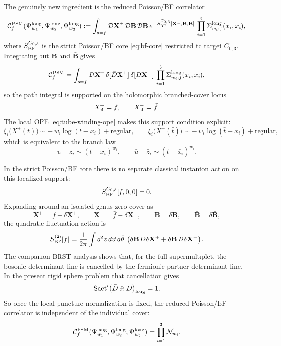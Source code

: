 \documentclass[11pt]{article}
\newcommand{\mc}[1]{\mathcal{#1}}
\begin{document}
The genuinely new ingredient is the reduced Poisson/BF correlator
\begin{equation}\label{eq:fixed-cover-psm-path-integral}
\mc C_f^{\rm PSM}(\Psi_{w_1}^{\rm long},\Psi_{w_2}^{\rm long},\Psi_{w_3}^{\rm long})
:=
\int_{\mathfrak s=f}
\mc D\mathbf X^\pm\,\mc D\mathbf B\,\mc D\bar{\mathbf B}\,
e^{-S_{\rm BF}^{C_{0,3}}[\mathbf X^\pm,\mathbf B,\bar{\mathbf B}]}\,
\prod_{i=1}^3 \Sigma^{\rm long}_{w_i;f}(x_i,\bar x_i),
\end{equation}
where $S_{\rm BF}^{C_{0,3}}$ is the strict Poisson/BF core \eqref{eq:bf-core} restricted to target $C_{0,3}$. Integrating out $\mathbf B$ and $\bar{\mathbf B}$ gives
\begin{equation}\label{eq:fixed-cover-psm-localization}
\mc C_f^{\rm PSM}
=
\int_{\mathfrak s=f}
\mc D\mathbf X^\pm\,
\delta[\bar D\mathbf X^+]\,\delta[D\mathbf X^-]\,
\prod_{i=1}^3 \Sigma^{\rm long}_{w_i;f}(x_i,\bar x_i),
\end{equation}
so the path integral is supported on the holomorphic branched-cover locus
\[
X^+_{\rm cl}=f,\qquad X^-_{\rm cl}=\bar f.
\]
The local OPE \eqref{eq:tube-winding-ope} makes this support condition explicit:
\begin{equation}\label{eq:psm-vertex-local-monodromy}
\xi_i\!\big(X^+(t)\big)
\sim
-\,w_i\log(t-x_i)+\text{regular},
\qquad
\bar\xi_i\!\big(X^-(\bar t)\big)
\sim
-\,w_i\log(\bar t-\bar x_i)+\text{regular},
\end{equation}
which is equivalent to the branch law
\[
u-z_i\sim (t-x_i)^{w_i},
\qquad
\bar u-\bar z_i\sim (\bar t-\bar x_i)^{w_i}.
\]

In the strict Poisson/BF core there is no separate classical instanton action on this localized support:
\begin{equation}\label{eq:psm-classical-action-zero}
S_{\rm BF}^{C_{0,3}}[f,0,0]=0.
\end{equation}
Expanding around an isolated genus-zero cover as
\[
\mathbf X^+=f+\delta \mathbf X^+,\qquad
\mathbf X^-=\bar f+\delta \mathbf X^-,
\qquad
\mathbf B=\delta \mathbf B,\qquad
\bar{\mathbf B}=\delta \bar{\mathbf B},
\]
the quadratic fluctuation action is
\begin{equation}\label{eq:psm-quadratic-fluctuation}
S_{\rm BF}^{(2)}[f]
=
\frac{1}{2\pi}\int d^2z\,d\vartheta\,d\bar\vartheta\,
\left(
\delta \mathbf B\,\bar D \delta \mathbf X^+
+
\delta \bar{\mathbf B}\,D \delta \mathbf X^-
\right).
\end{equation}
The companion BRST analysis shows that, for the full supermultiplet, the bosonic determinant line is cancelled by the fermionic partner determinant line. In the present rigid sphere problem that cancellation gives
\begin{equation}\label{eq:psm-superdet-cancellation}
\mathrm{Sdet}'\big(\bar D\oplus D\big)_{\rm long}=1.
\end{equation}
So once the local puncture normalization is fixed, the reduced Poisson/BF correlator is independent of the individual cover:
\begin{equation}\label{eq:tree-level-cover-independence}
\mc C_f^{\rm PSM}(\Psi_{w_1}^{\rm long},\Psi_{w_2}^{\rm long},\Psi_{w_3}^{\rm long})
=
\prod_{i=1}^3 \mc N_{w_i}.
\end{equation}
\end{document}
